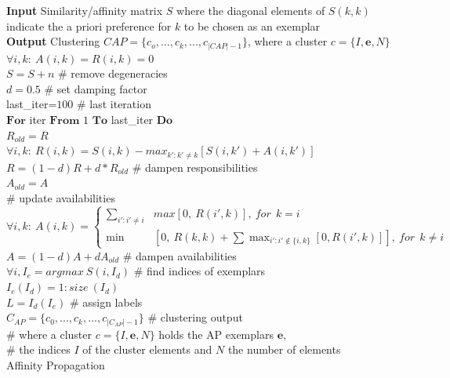 \documentclass[preprint,authoryear,a4paper,10pt,onecolumn]{elsarticle}
\begin{document}
%
\begin{algorithm}
\label{alg:AP}\textbf{Input} Similarity/affinity matrix $S$ where the diagonal elements of $S(k,k)$ indicate the a priori preference for $k$ to be chosen as an exemplar \\
\textbf{Output} Clustering $CAP=\{c_{o},...,c_{k},...,c_{|CAP|-1}\}$, where a cluster $c=\{I,\mathbf{e},N\}$\\
$\forall i,k:\: A(i,k)=R(i,k)=0$\\
$S=S+n$ \# remove degeneracies\\
$d=0.5$ \# set damping factor\\
last\_iter=$100$ \# last iteration \\
$\textbf{For}$ iter $\textbf{From}$ $1$ $\textbf{To}$ last\_iter $\textbf{Do}$ \\
\hspace*{2em} $R_{old}=R$\\
\hspace*{2em} $\forall i,k:\: R(i,k)=S(i,k)-max_{k':k'\neq k}[S(i,k')+A(i,k')]$ \\
\hspace*{2em} $R=(1-d)R+d*R_{old}$ \# dampen responsibilities \\
\hspace*{2em} $A_{old}=A$ \\
\hspace*{2em} \# update availabilities \\
\hspace*{2em} $\forall i,k:\: A(i,k)=\begin{cases} \sum_{i':i'\neq i} & max[0,\: R(i',k)],\: for\:\: k=i\\ \min & \left[0,\: 	R(k,k)+{\displaystyle \sum\max_{i':i'\notin\{i,k\}}[0,R(i',k)]}\right],\: for\:\: k\neq i\end{cases}$ \\
\hspace*{2em} $A=(1-d)A+dA_{old}$ \# dampen availabilities \\
$\forall i, I_{e}=argmax\: S(i,I_{d})$ \# find indices of exemplars \\
$I_{e}(I_{d})=1:size\: (I_{d})$ \\
$L=I_{d}(I_{e})$ \# assign labels \\
$C_{AP}=\{c_{0},...,c_{k},...,c_{|C_{AP}|-1}\}$ \# clustering output\\
\# where a cluster $c=\{I,\mathbf{e},N\}$ holds the AP exemplars $\mathbf{e}$,\\
\# the indices $I$ of the cluster elements and $N$ the number of elements \\
\caption{Affinity Propagation}


\end{algorithm}
\end{document}
